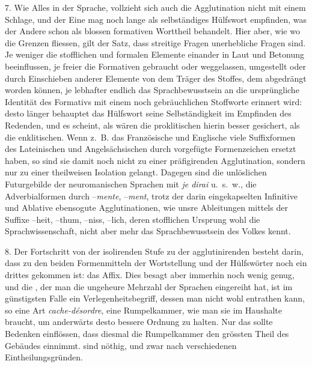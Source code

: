 \label{IV.III.II.4.7}7. Wie Alles in der Sprache, vollzieht sich auch die Agglutination nicht mit einem Schlage, und der Eine mag noch lange als selbständiges Hülfswort empfinden, was der Andere schon als blossen formativen Worttheil behandelt. Hier aber, wie  wo die Grenzen fliessen, gilt der Satz, dass streitige Fragen unerhebliche Fragen sind. Je weniger die stofflichen und formalen Elemente einander in Laut und Betonung beeinflussen, je freier die Formativen gebraucht oder weggelassen, um\label{fp.331}gestellt oder durch Einschieben anderer Elemente von dem Träger des Stoffes, dem  abgedrängt worden können, je lebhafter endlich das Sprachbewusstsein an die ursprüngliche Identität des Formativs mit einem noch gebräuchlichen Stoffworte erinnert wird: desto länger behauptet das Hülfswort seine Selbständigkeit im Empfinden des Redenden, und es scheint, als wären die proklitischen  hierin besser gesichert, als die enklitischen. Wenn z.~B. das Französische und Englische viele Suffixformen des Lateinischen und Angelsächsischen durch vorgefügte Formenzeichen ersetzt haben, so sind sie damit noch nicht zu einer präfigirenden Agglutination, sondern nur zu einer theilweisen Isolation gelangt. Dagegen sind die unlöslichen Futurgebilde der neuromanischen Sprachen mit  \textit{je dirai} u.~s.~w., die Adverbialformen durch –\textit{mente}, –\textit{ment}, trotz der darin eingekapselten Infinitive und Ablative ebensogute Agglutinationen, wie unsre Ableitungen mittels der \label{fp.200} Suffixe –heit, –thum, –niss, –lich, deren stofflichen Ursprung wohl die Sprachwissenschaft, nicht aber mehr das Sprachbewusstsein des Volkes kennt.

\label{sp.349}

\label{IV.III.II.4.8}8. Der Fortschritt von der isolirenden Stufe zu der agglutinirenden besteht darin, dass zu den beiden Formenmitteln der Wortstellung und der Hülfswörter noch ein drittes gekommen ist: das Affix. Dies besagt aber immerhin noch wenig genug, und die  , der man die ungeheure Mehrzahl der Sprachen eingereiht hat, ist im günstigsten Falle ein Verlegenheitsbegriff, dessen man nicht wohl entrathen kann, so eine Art \textit{cache-désordre}, eine Rumpelkammer, wie man sie im Haushalte braucht, um anderwärts desto bessere Ordnung zu halten. Nur das sollte Bedenken einflössen, dass diesmal die Rumpelkammer den grössten Theil des Gebäudes einnimmt.  sind nöthig, und zwar nach verschiedenen Eintheilungsgründen.


